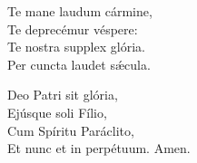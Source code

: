  Te mane laudum cármine,\\
 Te deprecémur véspere:\\
 Te nostra supplex glória.\\
 Per cuncta laudet sǽcula.

Deo Patri sit glória,\\
Ejúsque soli Fílio,\\
Cum Spíritu Paráclito,\\
Et nunc et in perpétuum. Amen. 
